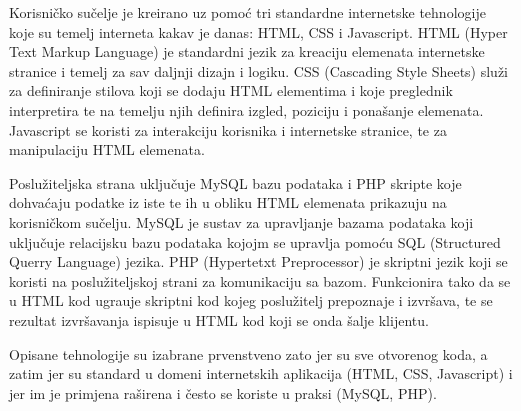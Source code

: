 Korisni\v{c}ko su\v{c}elje je kreirano uz pomo\'{c} tri standardne internetske tehnologije koje su temelj interneta kakav je danas: HTML, CSS i Javascript. HTML \cite{html} (Hyper Text Markup Language) je standardni jezik za kreaciju elemenata internetske stranice i temelj za sav daljnji dizajn i logiku. CSS \cite{css} (Cascading Style Sheets) slu\v{z}i za definiranje stilova koji se dodaju HTML elementima i koje preglednik interpretira te na temelju njih definira izgled, poziciju i pona\v{s}anje elemenata. Javascript \cite{javascript} se koristi za interakciju korisnika i internetske stranice, te za manipulaciju HTML elemenata.

Poslu\v{z}iteljska strana uklju\v{c}uje MySQL bazu podataka i PHP skripte koje dohva\'{c}aju podatke iz iste te ih u obliku HTML elemenata prikazuju na korisni\v{c}kom su\v{c}elju. MySQL je sustav za upravljanje bazama podataka koji uklju\v{c}uje relacijsku bazu podataka kojojm se upravlja pomo\'{c}u SQL (Structured Querry Language) jezika. PHP (Hypertetxt Preprocessor) je skriptni jezik koji se koristi na poslu\v{z}iteljskoj strani za komunikaciju sa bazom. Funkcionira tako da se u HTML kod ugra\dj uje skriptni kod kojeg poslu\v{z}itelj prepoznaje i izvr\v{s}ava, te se rezultat izvr\v{s}avanja ispisuje u HTML kod koji se onda \v{s}alje klijentu.

Opisane tehnologije su izabrane prvenstveno zato jer su sve otvorenog koda, a zatim jer su standard u domeni internetskih aplikacija (HTML, CSS, Javascript) i jer im je primjena ra\v{s}irena i \v{c}esto se koriste u praksi (MySQL, PHP).

